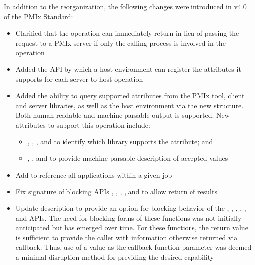 In addition to the reorganization, the following changes were introduced in v4.0 of the PMIx Standard:

\begin{itemize}
    \item Clarified that the  operation can immediately return  in lieu of passing the request to a \ac{PMIx} server if only the calling process is involved in the operation
    \item Added the  \ac{API} by which a host environment can register the attributes it supports for each server-to-host operation
    \item Added the ability to query supported attributes from the \ac{PMIx} tool, client and server libraries, as well as the host environment via the new  structure. Both human-readable and machine-parsable output is supported. New attributes to support this operation include:
    \begin{itemize}
        \item {}, , , and  to identify which library supports the attribute; and
        \item {}, , and  to provide machine-parsable description of accepted values
    \end{itemize}
    \item Add  to reference all applications within a given job
    \item Fix signature of blocking APIs , , , , and  to allow return of results
    \item Update description to provide an option for blocking behavior of the , , , , , and  APIs. The need for blocking forms of these functions was not initially anticipated but has emerged over time. For these functions, the return value is sufficient to provide the caller with information otherwise returned via callback. Thus, use of a  value as the callback function parameter was deemed a minimal disruption method for providing the desired capability

\end{itemize}
